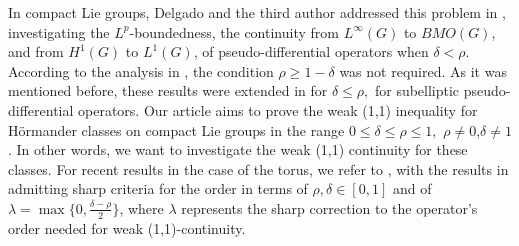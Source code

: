 \documentclass[12pt, reqno]{amsart}
\theoremstyle{definition}
\theoremstyle{remark}
\numberwithin{equation}{section}
\begin{document}
 In compact Lie groups, Delgado and the third author addressed this problem in \cite{9}, investigating the $L^p$-boundedness, the continuity from $L^\infty(G) $ to $BMO(G)$, and from $H^1(G)$ to $L^1(G)$, of pseudo-differential operators when $\delta<\rho$. According to the analysis in  \cite{9}, the condition $\rho\geq 1-\delta$ was not required. As it was mentioned before, these results were extended in \cite{CR} for $\delta\leq \rho,$ for subelliptic pseudo-differential operators. Our article aims to prove the weak (1,1) inequality for H\"ormander classes on compact Lie groups in the range $0\leq \delta\leq \rho\leq 1,$ $\rho\neq 0$,\;$\delta\neq 1$. In other words, we want to investigate the weak (1,1) continuity for these classes.
For recent results in the case of the torus, we refer to \cite{Cardona2014,Cardona:Martinez}, with the results in \cite{Cardona:Martinez} admitting sharp criteria for the order in terms of $\rho,\delta\in [0,1]$ and of $\lambda=\max\{0,\frac{\delta-\rho}{2}\}$, where $\lambda$ represents the sharp correction to the operator’s order needed for weak (1,1)-continuity.
 
\end{document}
